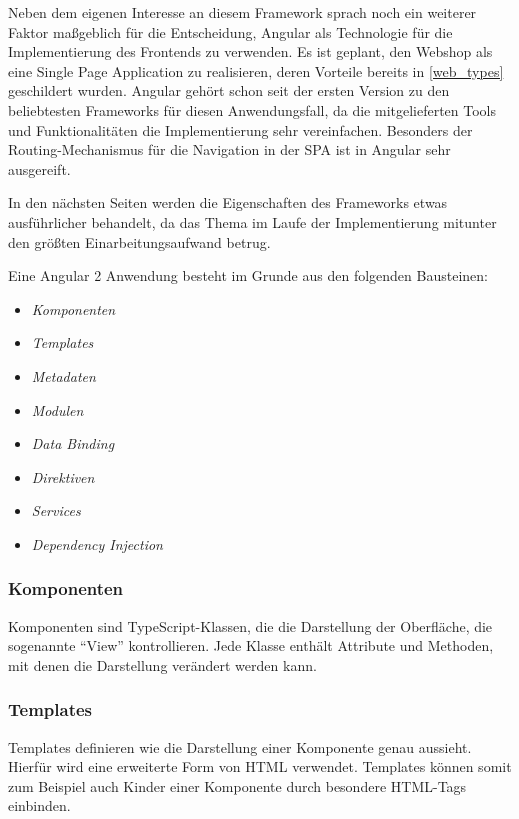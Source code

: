 Neben dem eigenen Interesse an diesem Framework sprach noch ein weiterer Faktor maßgeblich für die Entscheidung, Angular als Technologie für die Implementierung des Frontends zu verwenden.
Es ist geplant, den Webshop als eine Single Page Application zu realisieren, deren Vorteile bereits in \cref{web_types} geschildert wurden.
Angular gehört schon seit der ersten Version zu den beliebtesten Frameworks für diesen Anwendungsfall, da die mitgelieferten Tools und Funktionalitäten die Implementierung sehr vereinfachen.
Besonders der Routing-Mechanismus für die Navigation in der \acs{SPA} ist in Angular sehr ausgereift.

In den nächsten Seiten werden die Eigenschaften des Frameworks etwas ausführlicher behandelt, da das Thema im Laufe der Implementierung mitunter den größten Einarbeitungsaufwand betrug.

Eine Angular 2 Anwendung besteht im Grunde aus den folgenden Bausteinen\cite{Angular.io2017}:

\begin{itemize}
	\item \textit{Komponenten}
	\item \textit{Templates} 
	\item \textit{Metadaten}
	\item \textit{Modulen}
	\item \textit{Data Binding} 
	\item \textit{Direktiven}
	\item \textit{Services}
	\item \textit{Dependency Injection}
\end{itemize}

\subsubsection{Komponenten}
Komponenten sind TypeScript-Klassen, die die Darstellung der Oberfläche, die sogenannte \enquote{View} kontrollieren.
Jede Klasse enthält Attribute und Methoden, mit denen die Darstellung verändert werden kann.

\subsubsection{Templates}
Templates definieren wie die Darstellung einer Komponente genau aussieht.
Hierfür wird eine erweiterte Form von \acs{HTML} verwendet. Templates können somit zum Beispiel auch Kinder einer Komponente durch besondere HTML-Tags einbinden.

